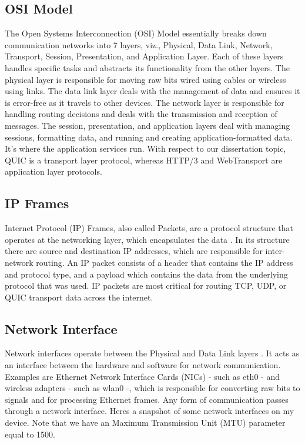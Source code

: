 \subsection{OSI Model}
The Open Systems Interconnection (OSI) Model \cite{kurose2017} essentially breaks down communication networks into 7 layers, viz., Physical, Data Link, Network, Transport, Session, Presentation, and Application Layer. Each of these layers handles specific tasks and abstracts its functionality from the other layers. The physical layer is responsible for moving raw bits wired using cables or wireless using links. The data link layer deals with the management of data and ensures it is error-free as it travels to other devices. The network layer is responsible for handling routing decisions and deals with the transmission and reception of messages. The session, presentation, and application layers deal with managing sessions, formatting data, and running and creating application-formatted data. It's where the application services run. With respect to our dissertation topic, QUIC is a transport layer protocol, whereas HTTP/3 and WebTransport are application layer protocols.


\subsection{IP Frames}
Internet Protocol (IP) Frames, also called Packets, are a protocol structure that operates at the networking layer, which encapsulates the data \cite{kurose2017}. In its structure there are source and destination IP addresses, which are responsible for inter-network routing. An IP packet consists of a header that contains the IP address and protocol type, and a payload which contains the data from the underlying protocol that was used. IP packets are most critical for routing TCP, UDP, or QUIC transport data across the internet.

\subsection{Network Interface}
Network interfaces operate between the Physical and Data Link layers \cite{kurose2017}. It acts as an interface between the hardware and software for network communication. Examples are Ethernet Network Interface Cards (NICs) - such as eth0 - and wireless adapters - such as wlan0 -, which is responsible for converting raw bits to signals and for processing Ethernet frames. Any form of communication passes through a network interface. Heres a snapshot of some network interfaces on my device.
Note that we have an Maximum Transmission Unit (MTU) parameter equal to 1500.


